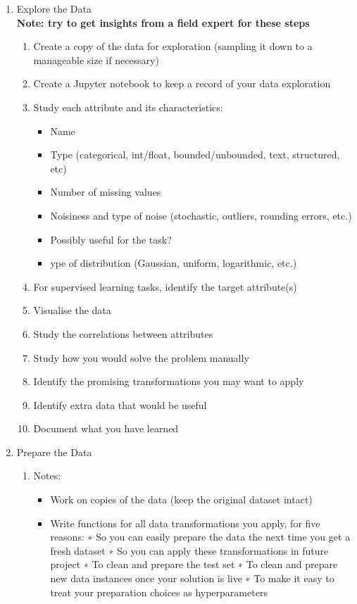 \documentclass[11pt]{article}
\begin{document}
\begin{enumerate}
\begin{enumerate}
\end{enumerate}
\item Explore the Data\\
\textbf{Note: try to get insights from a field expert for these steps}
\begin{enumerate}
\item Create a copy of the data for exploration (sampling it down to a manageable size if necessary)
\item Create a Jupyter notebook to keep a record of your data exploration
\item Study each attribute and its characteristics:
\begin{itemize}
\item Name
\item Type (categorical, int/float, bounded/unbounded, text, structured, etc)
\item Number of missing values
\item Noisiness and type of noise (stochastic, outliers, rounding errors, etc.)
\item Possibly useful for the task?
\item ype of distribution (Gaussian, uniform, logarithmic, etc.)
\end{itemize}
\item For supervised learning tasks, identify the target attribute(s)
\item Visualise the data
\item Study the correlations between attributes
\item Study how you would solve the problem manually
\item Identify the promising transformations you may want to apply
\item Identify extra data that would be useful
\item Document what you have learned
\end{enumerate}
\item Prepare the Data
\begin{enumerate}
\item Notes:
\begin{itemize}
\item Work on copies of the data (keep the original dataset intact)
\item Write functions for all data transformations you apply, for five reasons:
∗ So you can easily prepare the data the next time you get a fresh dataset
∗ So you can apply these transformations in future project
∗ To clean and prepare the test set
∗ To clean and prepare new data instances once your solution is live
∗ To make it easy to treat your preparation choices as hyperparameters
\end{itemize}


\end{enumerate}
\end{enumerate}
\end{document}
